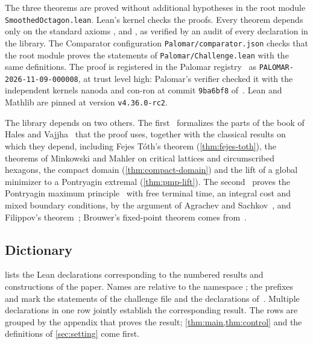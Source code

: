 The three theorems are proved without additional hypotheses in the root module
\texttt{SmoothedOctagon.lean}. Lean's kernel checks the proofs. Every theorem depends only on the
standard axioms ,  and , as verified by an
audit of every declaration in the library. The Comparator configuration
\texttt{Palomar/comparator.json} checks that the root module proves the statements of
\texttt{Palomar/Challenge.lean} with the same definitions. The proof is registered in the Palomar
registry~\cite{Palomar} as \texttt{PALOMAR-2026-11-09-000008}, at trust level high: Palomar's
verifier checked it with the independent kernels nanoda and con-ron at commit \texttt{9ba6bf8}
of~\cite{Companion}. Lean and Mathlib are pinned at version \texttt{v4.36.0-rc2}.

The library depends on two others. The first~\cite{SmoothedPolygonLean} formalizes the parts of
the book of Hales and Vajjha~\cite{HalesVajjha2024} that the proof uses, together with the
classical results on which they depend, including Fejes T\'oth's theorem (\cref{thm:fejes-toth}),
the theorems of Minkowski and Mahler on critical lattices and circumscribed hexagons, the compact
domain (\cref{thm:compact-domain}) and the lift of a global minimizer to a Pontryagin extremal
(\cref{thm:pmp-lift}). The second~\cite{OptimalControlLean} proves the Pontryagin maximum
principle~\cite{Pontryagin1962} with free terminal time, an integral cost and mixed boundary
conditions, by the argument of Agrachev and Sachkov~\cite{AgrachevSachkov2004}, and Filippov's
theorem~\cite{Filippov1962}; Brouwer's fixed-point theorem comes from~\cite{FixedPointLean}.

\subsection{Dictionary}\label{app:formal-dictionary}

 lists the Lean declarations corresponding to the numbered results and
constructions of the paper. Names are relative to the namespace ; the
prefixes  and  mark the statements of the
challenge file and the declarations of~\cite{SmoothedPolygonLean}. Multiple declarations in one
row jointly establish the corresponding result. The rows are grouped by the appendix that proves
the result; \cref{thm:main,thm:control} and the definitions of \cref{sec:setting} come first.


